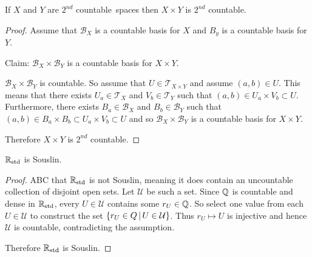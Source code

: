\documentclass[letterpaper,12pt,fleqn]{article}
\newcommand{\T}{\mathscr{T}}
\newcommand{\B}{\mathcal{B}}
\newcommand{\U}{\mathcal{U}}
\renewcommand{\sc}{\(2^{nd}\) countable}
\newcommand{\Rs}{\R_{\text{std}}}
\begin{document}
\begin{theorem}[5.13]
  If \(X\) and \(Y\) are \sc\ spaces then \(X\times Y\) is \sc.
\end{theorem}

\begin{proof}
  Assume that \(\B_X\) is a countable basis for \(X\) and \(B_y\) is a countable basis for \(Y\).

  Claim: \(\B_X\times\B_Y\) is a countable basis for \(X\times Y\).

  \(\B_X\times\B_Y\) is countable.  So assume that \(U\in\T_{X\times Y}\) and assume \((a,b)\in U\).  This means that
  there exists \(U_a\in\T_X\) and \(V_b\in\T_Y\) such that \((a,b)\in U_a\times V_b\subset U\).  Furthermore, there
  exists \(B_a\in\B_X\) and \(B_b\in\B_Y\) such that \((a,b)\in B_a\times B_b\subset U_a\times V_b\subset U\) and
  so \(\B_X\times\B_Y\) is a countable basis for \(X\times Y\).

  Therefore \(X\times Y\) is \sc.
\end{proof}

\begin{theorem}[5.21]
  \(\Rs\) is Souslin.
\end{theorem}

\begin{proof}
  ABC that \(\Rs\) is not Souslin, meaning it does contain an uncountable collection of disjoint open sets.  Let
  \(\U\) be such a set.  Since \(\mathbb{Q}\) is countable and dense in \(\Rs\), every \(U\in\U\) contains some
  \(r_U\in\mathbb{Q}\).  So select one value from each \(U\in\U\) to construct the set \(\setb{r_U\in Q}{U\in\U}\).
  Thus \(r_U\mapsto U\) is injective and hence \(\U\) is countable, contradicting the assumption.

  Therefore \(\Rs\) is Souslin.
\end{proof}
\end{document}
